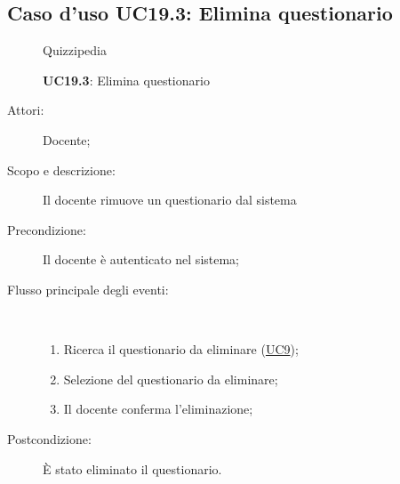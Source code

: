 \subsection{Caso d'uso UC19.3: Elimina questionario}
	\begin{figure}[H]
		\centering
		\begin{resizedtikzpicture}{\textwidth}
		\begin{umlsystem}[x=0, fill=lightgray!20]{Quizzipedia}
		\end{umlsystem}
		\end{resizedtikzpicture}
		\caption{\textbf{UC19.3}: Elimina questionario}
		\label{UC19.3}
	\end{figure}
\begin{description}
\item[Attori:] Docente;
\item[Scopo e descrizione:] Il docente rimuove un questionario dal sistema
      \item[Precondizione:] Il docente è autenticato nel sistema;

        \item[Flusso principale degli eventi:] \ 
 \begin{enumerate}
          \item Ricerca il questionario da eliminare (\hyperlink{UC9}{UC9});
          \item Selezione del questionario da eliminare;
          \item Il docente conferma l'eliminazione;

      \end{enumerate}
    \item[Postcondizione:] È stato eliminato il questionario.
  \end{description}
\hypertarget{UC19.4}{}
